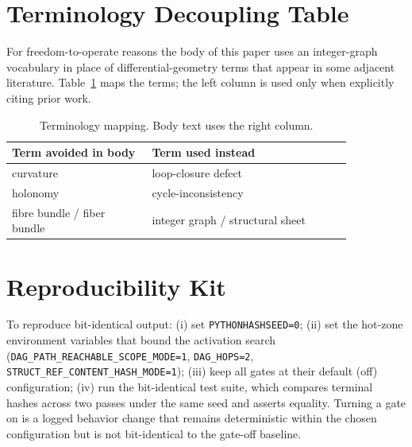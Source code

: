 \documentclass[11pt,a4paper]{article}
\begin{document}
\section{Terminology Decoupling Table}
\label{app:terms}

For freedom-to-operate reasons the body of this paper uses an
integer-graph vocabulary in place of differential-geometry terms that
appear in some adjacent literature. Table~\ref{tab:terms} maps the
terms; the left column is used only when explicitly citing prior work.

\begin{table}[h]
\centering
\small
\caption{Terminology mapping. Body text uses the right column.}
\label{tab:terms}
\begin{tabular}{@{}p{0.35\linewidth}p{0.50\linewidth}@{}}
\toprule
Term avoided in body & Term used instead \\
\midrule
curvature                  & loop-closure defect \\
holonomy                   & cycle-inconsistency \\
fibre bundle / fiber bundle & integer graph / structural sheet \\
\bottomrule
\end{tabular}
\end{table}

\section{Reproducibility Kit}
\label{app:repro}

To reproduce bit-identical output: (i) set \texttt{PYTHONHASHSEED=0};
(ii) set the hot-zone environment variables that bound the activation
search (\texttt{DAG\_PATH\_REACHABLE\_SCOPE\_MODE=1},
\texttt{DAG\_HOPS=2}, \texttt{STRUCT\_REF\_CONTENT\_HASH\_MODE=1});
(iii) keep all gates at their default (off) configuration;
(iv) run the bit-identical test suite, which compares terminal hashes
across two passes under the same seed and asserts equality. Turning a
gate on is a logged behavior change that remains deterministic within
the chosen configuration but is not bit-identical to the gate-off
baseline.
\end{document}
